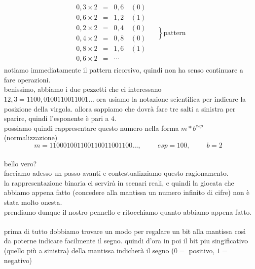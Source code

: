 \documentclass{article}
\newcommand{\hs} {
\hspace{1cm}
}
\begin{document}
\begin{equation}
\begin{aligned}
\begin{array}{rcl}
0,3 \times 2 & = & 0,6 \quad (0) \\
0,6 \times 2 & = & 1,2 \quad (1) \\
0,2 \times 2 & = & 0,4 \quad (0) \\
0,4 \times 2 & = & 0,8 \quad (0) \\
0,8 \times 2 & = & 1,6 \quad (1) \\
0,6 \times 2 & = & \cdots \
\end{array}
\end{aligned}
\left.
\begin{aligned}
 \\
 \\
 \\
\end{aligned}
\right \} \text{pattern}
\label{eq:conversione floatig binario 1}
\end{equation}
notiamo immediatamente il pattern ricorsivo, quindi non ha senso continuare a fare operazioni. \\
benissimo, abbiamo i due pezzetti che ci interessano $12,3 = 1100,0100110011001\dots$ 
ora usiamo la notazione scientifica per indicare la posizione della virgola. allora sappiamo che dovrà fare tre salti a sinistra per sparire, quindi l'esponente è pari a $4$. \\  
possiamo quindi rappresentare questo numero nella forma $m * b^{esp}$ (normalizzazione)\\ 
$$ m = 110001001100110011001100\dots, \hspace{1cm} esp = 100, \hs b = 2$$ \\
bello vero?\\
facciamo adesso un passo avanti e contestualizziamo questo ragionamento. \\ 
la rappresentazione binaria ci servirà in scenari reali, e quindi la giocata che abbiamo appena fatto (concedere alla mantissa un numero infinito di cifre) non è stata molto onesta. \\ 
prendiamo dunque il nostro pennello e ritocchiamo quanto abbiamo appena fatto.\\ \\
prima di tutto dobbiamo trovare un modo per regalare un bit alla mantissa così da poterne indicare facilmente il segno. 
quindi d'ora in poi il bit piu singificativo (quello più a sinistra) della mantissa indicherà il segno ($0 =$ positivo, $1=$ negativo)\\ 
\end{document}
